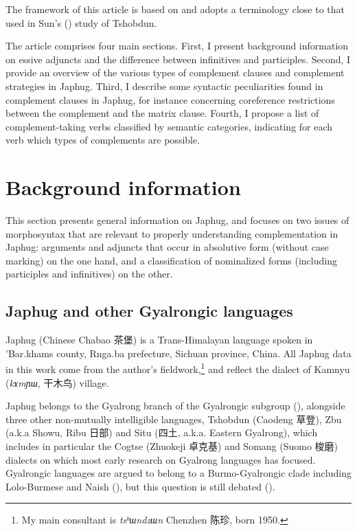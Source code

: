 \documentclass[oneside,a4paper,11pt]{article}
\newcommand{\ipa}[1]{\textit{\phon#1}}
\newcommand{\zh}[1]{{\cn #1}}
\begin{document}
The framework of this article is based on  \citet[9]{dixon06complementation} and adopts a terminology close to that used in Sun's (\citeyear{sun12complementation}) study of Tshobdun.

The article comprises four main sections. First, I present background information on essive adjuncts and the difference between infinitives and participles. Second, I provide an overview of the various types of complement clauses and complement strategies in Japhug. Third, I describe some  syntactic peculiarities found in complement clauses in Japhug, for instance concerning coreference restrictions between the complement and the matrix clause. Fourth, I propose a list of complement-taking verbs classified by semantic categories, indicating for each verb which types of complements are possible.

\section{Background information}
This section presents general information on Japhug, and focuses on two issues of morphosyntax that are relevant to properly understanding complementation in Japhug: arguments and adjuncts that occur in absolutive form (without case marking) on the one hand, and a classification of nominalized forms (including participles and infinitives) on the other.

\subsection{Japhug and other Gyalrongic languages}
Japhug (Chinese Chabao \zh{茶堡}) is a Trans-Himalayan language spoken in 'Bar.khams county, Rnga.ba prefecture, Sichuan province, China. All Japhug data in this work come from the author's fieldwork,\footnote{My main consultant is \ipa{tsʰɯndzɯn} Chenzhen \zh{陈珍}, born 1950. } and reflect the dialect of Kamnyu (\ipa{kɤmɲɯ}, \zh{干木鸟}) village.

Japhug belongs to the Gyalrong branch of the Gyalrongic subgroup (\citealt{jackson00puxi}), alongside three other non-mutually intelligible languages, Tshobdun (Caodeng \zh{草登}), Zbu (a.k.a Showu, Ribu \zh{日部}) and Situ (\zh{四土}, a.k.a. Eastern Gyalrong), which includes in particular the Cogtse (Zhuokeji \zh{卓克基}) and Somang (Suomo \zh{梭磨}) dialects on which most early research on Gyalrong languages has focused. Gyalrongic languages are argued to belong to a Burmo-Gyalrongic clade including Lolo-Burmese and Naish (\citealt{jacques.michaud11naish}), but this question is still debated (\citealt{thurgood17genetic}).
\end{document}
